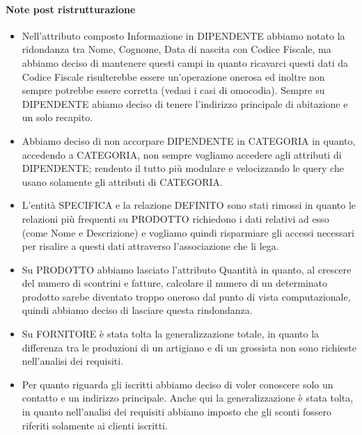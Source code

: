 \paragraph*{Note post ristrutturazione}
\begin{itemize}

\item Nell'attributo composto Informazione in DIPENDENTE abbiamo notato la ridondanza tra Nome, Cognome, Data di nascita con Codice Fiscale, ma abbiamo deciso di mantenere questi campi in quanto ricavarci questi dati da Codice Fiscale risulterebbe essere un'operazione onerosa ed inoltre non sempre potrebbe essere corretta (vedasi i casi di omocodia). Sempre su DIPENDENTE abiamo deciso di tenere l'indirizzo principale di abitazione e un solo recapito.

\item Abbiamo deciso di non accorpare DIPENDENTE in CATEGORIA in quanto, accedendo a CATEGORIA, non sempre vogliamo accedere agli attributi di DIPENDENTE; rendento il tutto pi\`u modulare e velocizzando le query che usano solamente gli attributi di CATEGORIA.

\item L'entit\`a SPECIFICA e la relazione DEFINITO sono stati rimossi in quanto le relazioni pi\`u frequenti su PRODOTTO richiedono i dati relativi ad esso (come Nome e Descrizione) e vogliamo quindi risparmiare gli accessi necessari per risalire a questi dati attraverso l'associazione che li lega.

\item Su PRODOTTO abbiamo lasciato l'attributo Quantit\`a in quanto, al crescere del numero di scontrini e fatture, calcolare il numero di un determinato prodotto sarebe diventato troppo oneroso dal punto di vista computazionale, quindi abbiamo deciso di lasciare questa rindondanza.

\item Su FORNITORE \`e stata tolta la generalizzazione totale, in quanto la differenza tra le produzioni di un artigiano e di un grossista non sono richieste nell'analisi dei requisiti.

\item Per quanto riguarda gli iscritti abbiamo deciso di voler conoscere solo un contatto e un indirizzo principale. Anche qui la generalizzazione \`e stata tolta, in quanto nell'analisi dei requisiti abbiamo imposto che gli sconti fossero riferiti solamente ai clienti iscritti.
  
\end{itemize}
